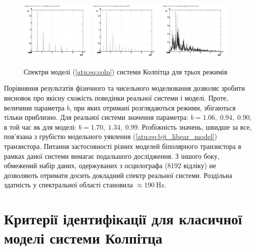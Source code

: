 \begin{figure}[htb!]
 \centerline{
   \includegraphics[width=0.32\textwidth]{p/mod/colp_f-p_f_b=1x70.png}
   \includegraphics[width=0.32\textwidth]{p/mod/colp_f-p_f_b=1x37.png}
   \includegraphics[width=0.32\textwidth]{p/mod/colp_f-p_f_b=0x99.png}
 }
\caption{Спектри моделі (\ref{atu:eq:colp}) системи Колпітца для трьох режимів}
\label{atu:f:colp_model_f}
\end{figure}


Порівняння результатів фізичного та чисельного моделювання
дозволяє зробити висновок про якісну схожість поведінки реальної
системи і моделі. Проте, величини параметра
$b $, при яких отримані розглядаються режими, збігаються тільки
приблизно. Для реальної системи значення параметра:
$b = 1.06, \; 0.94, \; 0.90 $, в той час як для моделі:
$b = 1.70, \; 1.34, \; 0.99 $. Розбіжність
значень, швидше за все, пов'язана з грубістю модельного уявлення
(\ref{atu:eq:bjt_libear_model}) транзистора. Питання застосовності різних
моделей біполярного транзистора в рамках даної системи вимагає
подальшого дослідження. З іншого боку, обмежений набір даних,
одержуваних з осцилографа (8192 відліку) не дозволяють отримати
досить докладний спектр реальної системи. Роздільна здатність у спектральної
області становила $\approx \SI{190}{\hertz} $.


\section{Критерії ідентифікації для класичної моделі системи Колпітца}%


